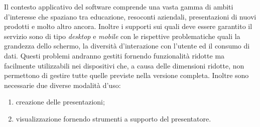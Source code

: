 Il contesto applicativo del software comprende una vasta gamma di ambiti d'interesse che spaziano tra educazione, resoconti aziendali, presentazioni di nuovi prodotti e molto altro ancora.
Inoltre i supporti sui quali deve essere garantito il servizio sono di tipo \textit{desktop} e \textit{mobile} con le rispettive problematiche quali la grandezza dello schermo, la diversità d'interazione con l'utente ed il consumo di dati. Questi problemi andranno gestiti fornendo funzionalità ridotte ma facilmente utilizzabili nei dispositivi che, a causa delle dimensioni ridotte, non permettono di gestire tutte quelle previste nella versione completa.
Inoltre sono necessarie due diverse modalità d'uso:
\begin{enumerate}
  \item creazione delle presentazioni;
  \item visualizzazione fornendo strumenti a supporto del presentatore.
\end{enumerate}
